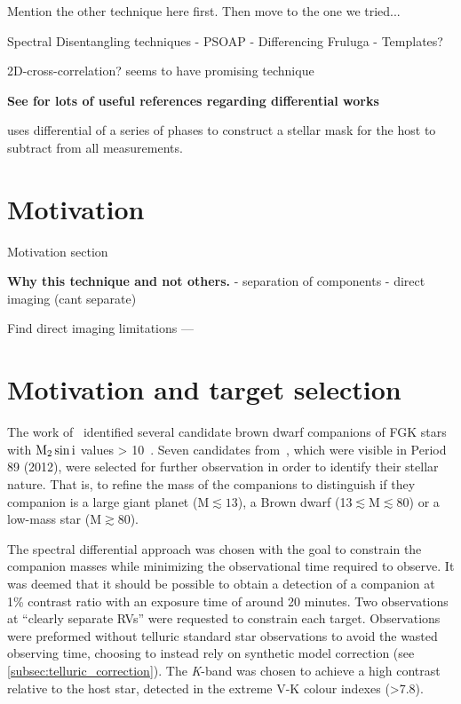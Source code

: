 Mention the other technique here first.
Then move to the one we tried...




Spectral Disentangling techniques
- PSOAP
- Differencing Fruluga
- Templates?

2D-cross-correlation?   \citet{piskorz_evidence_2016} seems to have promising technique


\textbf{
See \citet{kostogryz_spectral_2013} for lots of useful references regarding differential works \citet{simon_disentangling_1994}}

\citet{rodler_weighing_2012} uses differential of a series of phases to construct a stellar mask for the host to subtract from all measurements.




\section{Motivation}

Motivation section

\textbf{Why this technique and not others.}
- separation of components
- direct imaging (cant separate)


Find direct imaging limitations ---




\section{Motivation and target selection}
\label{sec:target_motivation}
The work of~\citet{sahlmann_search_2011} identified several candidate brown dwarf companions of FGK stars with \(\rm M_2 \sin{i}\) values > 10~\Mjup{}.
Seven candidates from~\citet{sahlmann_search_2011}, which were visible in Period 89 (2012), were selected for further observation in order to identify their stellar nature.
That is, to refine the mass of the companions to distinguish if they companion is a large giant planet (M$\apprle13$\Mjup), a Brown dwarf (13$\apprle $M$\apprle80$\Mjup) or a low-mass star (M$\apprge80$\Mjup).

The spectral differential approach was chosen with the goal to constrain the companion masses while minimizing the observational time required to observe.
It was deemed that it should be possible to obtain a detection of a companion at 1\% contrast ratio with an exposure time of around 20 minutes.
Two observations at ``clearly separate RVs'' were requested to constrain each target.
Observations were preformed without telluric standard star observations to avoid the wasted observing time, choosing to instead rely on synthetic model correction (see \cref{subsec:telluric_correction}).
The \textit{K}-band was chosen to achieve a high contrast relative to the host star, detected in the extreme V-K colour indexes (>7.8).

